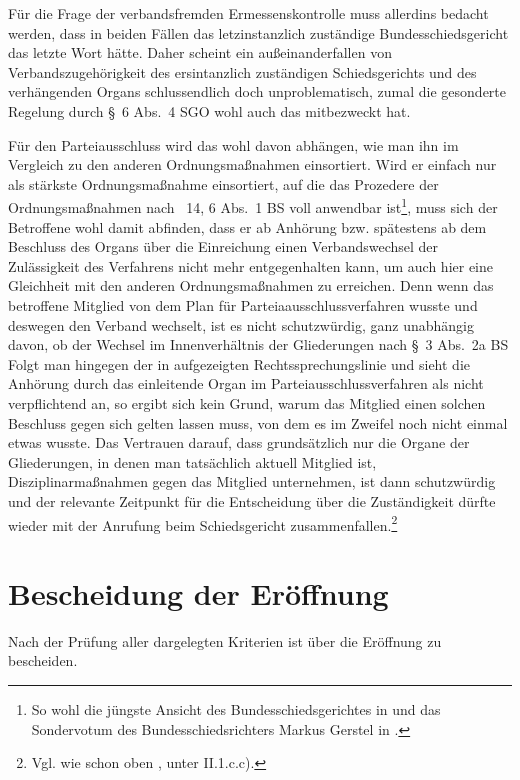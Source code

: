 Für die Frage der verbandsfremden Ermessenskontrolle muss allerdins bedacht werden, dass in beiden Fällen das letzinstanzlich zuständige Bundesschiedsgericht das letzte Wort hätte.
Daher scheint ein außeinanderfallen von Verbandszugehörigkeit des ersintanzlich zuständigen Schiedsgerichts und des verhängenden Organs schlussendlich doch unproblematisch, zumal die gesonderte Regelung durch \S~6 Abs.~4 SGO wohl auch das mitbezweckt hat.

Für den Parteiausschluss wird das wohl davon abhängen, wie man ihn im Vergleich zu den anderen Ordnungsmaßnahmen einsortiert. Wird er einfach nur als stärkste Ordnungsmaßnahme einsortiert, auf die das Prozedere der Ordnungsmaßnahmen nach \SSS~14, 6 Abs.~1 BS voll anwendbar ist\footnote{So wohl die jüngste Ansicht des Bundesschiedsgerichtes in \cite{BSG3615HS} und das Sondervotum des Bundesschiedsrichters Markus Gerstel in \cite{BSG20131005}.}, muss sich der Betroffene wohl damit abfinden, dass er ab Anhörung  bzw. spätestens ab dem Beschluss des Organs über die Einreichung einen Verbandswechsel der Zulässigkeit des Verfahrens nicht mehr entgegenhalten kann, um auch hier eine Gleichheit mit den anderen Ordnungsmaßnahmen zu erreichen.
Denn wenn das betroffene Mitglied  von dem Plan für Parteiaausschlussverfahren wusste und deswegen den Verband wechselt, ist es nicht schutzwürdig, ganz unabhängig davon, ob der Wechsel im Innenverhältnis der Gliederungen nach \S~3 Abs.~2a BS
Folgt man hingegen der in \cite{BSG20131005} aufgezeigten Rechtssprechungslinie und sieht die Anhörung durch das einleitende Organ im Parteiausschlussverfahren als nicht verpflichtend an, so ergibt sich kein Grund, warum das Mitglied einen solchen Beschluss gegen sich gelten lassen muss, von dem es im Zweifel noch nicht einmal etwas wusste.
Das Vertrauen darauf, dass grundsätzlich nur die Organe der Gliederungen, in denen man tatsächlich aktuell Mitglied ist,  Disziplinarmaßnahmen gegen das Mitglied unternehmen, ist dann schutzwürdig und der relevante Zeitpunkt für die Entscheidung über die Zuständigkeit dürfte wieder mit der Anrufung beim Schiedsgericht zusammenfallen.\footnote{Vgl.  wie schon oben \cite[S. 9]{BSG115HS}, unter II.1.c.c).}

\section{Bescheidung der Eröffnung}
\label{Standardworkflow:Beschluss}
Nach der Prüfung aller dargelegten Kriterien ist über die Eröffnung zu bescheiden.

